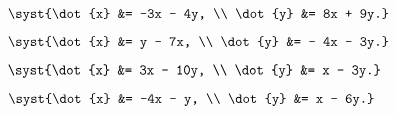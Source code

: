 \begin{multicols}{4}
\begin{enumtasks}
			\label{linsys_hmg:simple2d_part2}
			\item \( \syst{\dot{x} &= -3x - 4y, \\ \dot{y} &= 8x + 9y.} \) %
			\item \( \syst{\dot{x} &= y - 7x, \\ \dot{y} &= - 4x - 3y.} \) %
			\item \( \syst{\dot{x} &= 3x - 10y, \\ \dot{y} &= x - 3y.} \) %
			\item \( \syst{\dot{x} &= -4x - y, \\ \dot{y} &= x - 6y.} \) %

\end{enumtasks}
\end{multicols}
